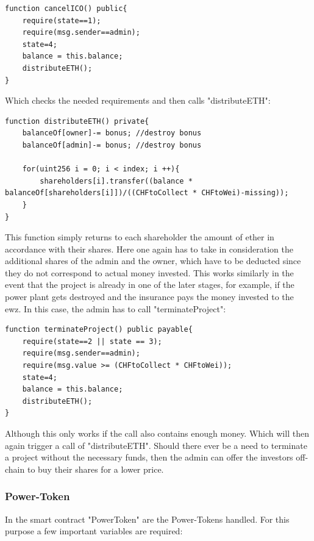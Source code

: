 \begin{lstlisting}[language=Solidity, firstnumber=87]
function cancelICO() public{
    require(state==1);
    require(msg.sender==admin);
    state=4;
    balance = this.balance;
    distributeETH();
}

\end{lstlisting}
Which checks the needed requirements and then calls "distributeETH":


\begin{lstlisting}[language=Solidity, firstnumber=129]
function distributeETH() private{
    balanceOf[owner]-= bonus; //destroy bonus
    balanceOf[admin]-= bonus; //destroy bonus
    
    for(uint256 i = 0; i < index; i ++){
        shareholders[i].transfer((balance * balanceOf[shareholders[i]])/((CHFtoCollect * CHFtoWei)-missing));
    }
}
\end{lstlisting}

This function simply returns to each shareholder the amount of ether in accordance with their shares. Here one again has to take in consideration the additional shares of the admin and the owner, which have to be deducted since they do not correspond to actual money invested. This works similarly in the event that the project is already in one of the later stages, for example, if the power plant gets destroyed and the insurance pays the money invested to the ewz. In this case, the admin has to call "terminateProject":

\begin{lstlisting}[language=Solidity, firstnumber=120]
function terminateProject() public payable{
    require(state==2 || state == 3);
    require(msg.sender==admin);
    require(msg.value >= (CHFtoCollect * CHFtoWei));
    state=4;
    balance = this.balance;
    distributeETH();
}
\end{lstlisting}

Although this only works if the call also contains enough money. Which will then again trigger a call of "distributeETH". Should there ever be a need to terminate a project without the necessary funds, then the admin can offer the investors off-chain to buy their shares for a lower price.

\subsubsection{Power-Token}
In the smart contract "PowerToken" are the Power-Tokens handled. For this purpose a few important variables are required:

